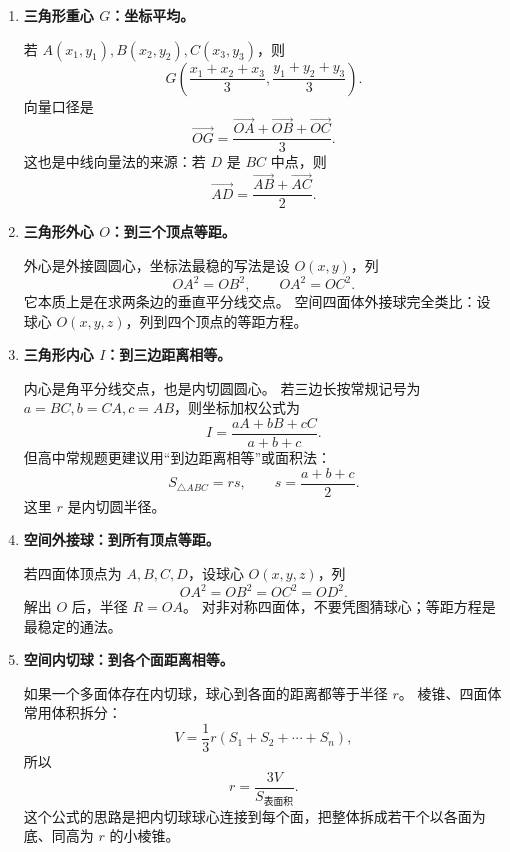 \documentclass[11pt,a4paper]{ctexart}
\begin{document}
\begin{enumerate}[label=\arabic*. , leftmargin=2em, itemsep=0.8em]
  \item \textbf{三角形重心 \(G\)：坐标平均。}
  
  若 \(A(x_1,y_1),B(x_2,y_2),C(x_3,y_3)\)，则
  \[
    G\left(\frac{x_1+x_2+x_3}{3},\frac{y_1+y_2+y_3}{3}\right).
  \]
  向量口径是
  \[
    \vec{OG}=\frac{\vec{OA}+\vec{OB}+\vec{OC}}{3}.
  \]
  这也是中线向量法的来源：若 \(D\) 是 \(BC\) 中点，则
  \[
    \vec{AD}=\frac{\vec{AB}+\vec{AC}}{2}.
  \]

  \item \textbf{三角形外心 \(O\)：到三个顶点等距。}
  
  外心是外接圆圆心，坐标法最稳的写法是设 \(O(x,y)\)，列
  \[
    OA^2=OB^2,\qquad OA^2=OC^2.
  \]
  它本质上是在求两条边的垂直平分线交点。
  空间四面体外接球完全类比：设球心 \(O(x,y,z)\)，列到四个顶点的等距方程。

  \item \textbf{三角形内心 \(I\)：到三边距离相等。}
  
  内心是角平分线交点，也是内切圆圆心。
  若三边长按常规记号为 \(a=BC,b=CA,c=AB\)，则坐标加权公式为
  \[
    I=\frac{aA+bB+cC}{a+b+c}.
  \]
  但高中常规题更建议用“到边距离相等”或面积法：
  \[
    S_{\triangle ABC}=rs,\qquad s=\frac{a+b+c}{2}.
  \]
  这里 \(r\) 是内切圆半径。

  \item \textbf{空间外接球：到所有顶点等距。}
  
  若四面体顶点为 \(A,B,C,D\)，设球心 \(O(x,y,z)\)，列
  \[
    OA^2=OB^2=OC^2=OD^2.
  \]
  解出 \(O\) 后，半径 \(R=OA\)。
  对非对称四面体，不要凭图猜球心；等距方程是最稳定的通法。

  \item \textbf{空间内切球：到各个面距离相等。}
  
  如果一个多面体存在内切球，球心到各面的距离都等于半径 \(r\)。
  棱锥、四面体常用体积拆分：
  \[
    V=\frac13 r\left(S_1+S_2+\cdots+S_n\right),
  \]
  所以
  \[
    r=\frac{3V}{S_{\text{表面积}}}.
  \]
  这个公式的思路是把内切球球心连接到每个面，把整体拆成若干个以各面为底、同高为 \(r\) 的小棱锥。
\end{enumerate}
\end{document}
